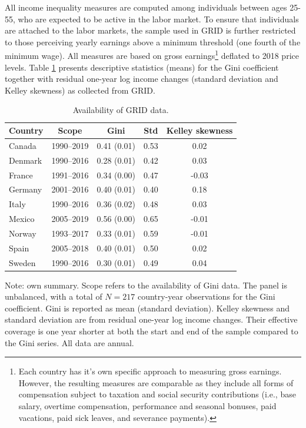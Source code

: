 \documentclass[12pt, a4paper]{article}
\begin{document}
All income inequality measures are computed among individuals between ages 25-55, who are expected to be active in the labor market. To ensure that individuals are attached to the labor markets, the sample used in GRID is further restricted to those perceiving yearly earnings above a minimum threshold (one fourth of the minimum wage). All measures are based on gross earnings\footnote{Each country has it's own specific approach to measuring gross earnings. However, the resulting measures are comparable as they include all forms of compensation subject to taxation and social security contributions (i.e., base salary, overtime compensation, performance and seasonal bonuses, paid vacations, paid sick leaves, and severance payments).} deflated to 2018 price levels. Table \ref{table:a5} presents descriptive statistics (means) for the Gini coefficient together with residual one-year log income changes (standard deviation and Kelley skewness) as collected from GRID.

\begin{table}[H]
\captionsetup{justification=raggedright, singlelinecheck=false}
\centering
\caption{Availability of GRID data.}
\small 
\setlength{\tabcolsep}{5pt} 
\renewcommand{\arraystretch}{0.95}
\begin{tabular}{l c c c c}
\toprule
Country & Scope & Gini & Std & Kelley skewness \\
\midrule
Canada   & 1990--2019 & 0.41 (0.01) & 0.53 & 0.02\\
Denmark  & 1990--2016 & 0.28 (0.01) & 0.42 & 0.03\\
France   & 1991--2016 & 0.34 (0.00) & 0.47 & -0.03\\
Germany  & 2001--2016 & 0.40 (0.01) & 0.40 & 0.18\\
Italy    & 1990--2016 & 0.36 (0.02) & 0.48 & 0.03\\
Mexico   & 2005--2019 & 0.56 (0.00) & 0.65 & -0.01\\
Norway   & 1993--2017 & 0.33 (0.01) & 0.59 & -0.01\\
Spain    & 2005--2018 & 0.40 (0.01) & 0.50 & 0.02\\
Sweden   & 1990--2016 & 0.30 (0.01) & 0.49 & 0.04\\
\bottomrule
\end{tabular}

\vspace{0.1cm}
\parbox{0.9\linewidth}{\raggedright\footnotesize Note: own summary. Scope refers to the availability of Gini data. The panel is unbalanced, with a total of $N=217$ country-year observations for the Gini coefficient. Gini is reported as mean (standard deviation). Kelley skewness and standard deviation are from residual one-year log income changes. Their effective coverage is one year shorter at both the start and end of the sample compared to the Gini series. All data are annual.}
\label{table:a5}
\end{table}
\end{document}

